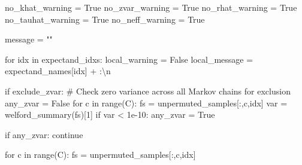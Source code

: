 \documentclass[
  letterpaper,
  DIV=11,
  numbers=noendperiod]{scrartcl}
\newenvironment{Shaded}{\begin{snugshade}}{\end{snugshade}}
\newcommand{\BuiltInTok}[1]{\textcolor[rgb]{0.00,0.23,0.31}{#1}}
\newcommand{\CharTok}[1]{\textcolor[rgb]{0.13,0.47,0.30}{#1}}
\newcommand{\CommentTok}[1]{\textcolor[rgb]{0.37,0.37,0.37}{#1}}
\newcommand{\ControlFlowTok}[1]{\textcolor[rgb]{0.00,0.23,0.31}{#1}}
\newcommand{\DecValTok}[1]{\textcolor[rgb]{0.68,0.00,0.00}{#1}}
\newcommand{\FloatTok}[1]{\textcolor[rgb]{0.68,0.00,0.00}{#1}}
\newcommand{\KeywordTok}[1]{\textcolor[rgb]{0.00,0.23,0.31}{#1}}
\newcommand{\NormalTok}[1]{\textcolor[rgb]{0.00,0.23,0.31}{#1}}
\newcommand{\OperatorTok}[1]{\textcolor[rgb]{0.37,0.37,0.37}{#1}}
\newcommand{\StringTok}[1]{\textcolor[rgb]{0.13,0.47,0.30}{#1}}
\newcommand{\VariableTok}[1]{\textcolor[rgb]{0.07,0.07,0.07}{#1}}
\begin{document}
\begin{Shaded}
\begin{Highlighting}[]
\NormalTok{  no\_khat\_warning }\OperatorTok{=} \VariableTok{True}
\NormalTok{  no\_zvar\_warning }\OperatorTok{=} \VariableTok{True}
\NormalTok{  no\_rhat\_warning }\OperatorTok{=} \VariableTok{True}
\NormalTok{  no\_tauhat\_warning }\OperatorTok{=} \VariableTok{True}
\NormalTok{  no\_neff\_warning }\OperatorTok{=} \VariableTok{True}

\NormalTok{  message }\OperatorTok{=} \StringTok{""}

  \ControlFlowTok{for}\NormalTok{ idx }\KeywordTok{in}\NormalTok{ expectand\_idxs:}
\NormalTok{    local\_warning }\OperatorTok{=} \VariableTok{False}
\NormalTok{    local\_message }\OperatorTok{=}\NormalTok{ expectand\_names[idx] }\OperatorTok{+} \StringTok{\textquotesingle{}:}\CharTok{\textbackslash{}n}\StringTok{\textquotesingle{}}
  
    \ControlFlowTok{if}\NormalTok{ exclude\_zvar:}
      \CommentTok{\# Check zero variance across all Markov chains for exclusion}
\NormalTok{      any\_zvar }\OperatorTok{=} \VariableTok{False}
      \ControlFlowTok{for}\NormalTok{ c }\KeywordTok{in} \BuiltInTok{range}\NormalTok{(C):}
\NormalTok{        fs }\OperatorTok{=}\NormalTok{ unpermuted\_samples[:,c,idx]}
\NormalTok{        var }\OperatorTok{=}\NormalTok{ welford\_summary(fs)[}\DecValTok{1}\NormalTok{]}
        \ControlFlowTok{if}\NormalTok{ var }\OperatorTok{\textless{}} \FloatTok{1e{-}10}\NormalTok{:}
\NormalTok{          any\_zvar }\OperatorTok{=} \VariableTok{True}
      
      \ControlFlowTok{if}\NormalTok{ any\_zvar:}
        \ControlFlowTok{continue}
    
    \ControlFlowTok{for}\NormalTok{ c }\KeywordTok{in} \BuiltInTok{range}\NormalTok{(C):}
\NormalTok{      fs }\OperatorTok{=}\NormalTok{ unpermuted\_samples[:,c,idx]}
      

\end{Highlighting}
\end{Shaded}
\end{document}
